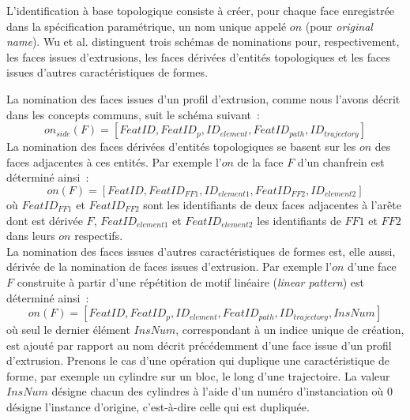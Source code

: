 L'identification à base topologique consiste à créer, pour chaque face
enregistrée dans la spécification paramétrique, un nom unique appelé
\(on\) (pour \emph{original name}). %
Wu et al. distinguent trois schémas de nominations pour, respectivement, les faces
issues d'extrusions, les faces dérivées d'entités topologiques et les
faces issues d'autres caractéristiques de formes. %

La nomination des faces issues d'un profil d'extrusion, comme nous l'avons
décrit dans les concepts communs, suit le schéma suivant~: %
\[on_{side}(F) = [FeatID, FeatID_{p}, ID_{element},FeatID_{path},ID_{trajectory}]\]
La nomination des faces dérivées d'entités topologiques se basent sur les \(on\) des faces adjacentes à ces entités. Par exemple l'\(on\) de la face \(F\) d'un chanfrein est déterminé ainsi~:
\[on(F) = [FeatID, FeatID_{FF1}, ID_{element1},FeatID_{FF2},ID_{element2}]\]
où \(FeatID_{FF1}\) et \(FeatID_{FF2}\) sont les identifiants de deux faces
adjacentes à l'arête dont est dérivée \(F\), \(FeatID_{element1}\) et
\(FeatID_{element2}\) les identifiants de \(FF1\) et \(FF2\) dans leurs \(on\) respectifs.\\

La nomination des faces issues d'autres caractéristiques de formes est, elle
aussi, dérivée de la nomination de faces issues d'extrusion. Par exemple
l'\(on\) d'une face \(F\) construite à partir d'une répétition de motif linéaire
(\textit{linear pattern}) est déterminé ainsi~:
\[on(F) = [FeatID, FeatID_{p}, ID_{element}, FeatID_{path},ID_{trajectory}, InsNum]\]
où seul le dernier élément \(InsNum\), correspondant à un indice unique de
création, est ajouté par rapport au nom décrit précédemment d'une face issue
d'un profil d'extrusion. Prenons le cas d'une opération qui duplique une
caractéristique de forme, par exemple un cylindre sur un bloc, le long d'une
trajectoire. %
La valeur \(InsNum\) désigne chacun des cylindres à l'aide d'un numéro
d'instanciation où \(0\) désigne l'instance d'origine, c'est-à-dire celle qui
est dupliquée. %

